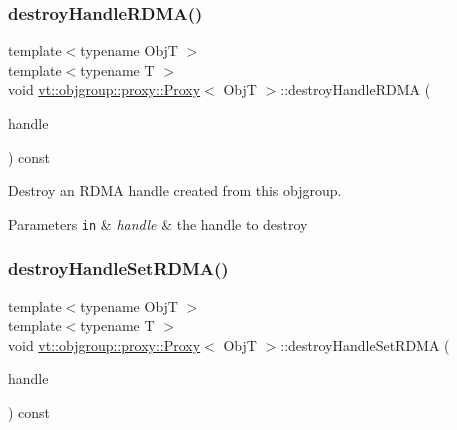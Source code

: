 \subsubsection{\texorpdfstring{destroy\+Handle\+R\+D\+M\+A()}{destroyHandleRDMA()}}
{\footnotesize\ttfamily template$<$typename ObjT $>$ \\
template$<$typename T $>$ \\
void \hyperlink{structvt_1_1objgroup_1_1proxy_1_1_proxy}{vt\+::objgroup\+::proxy\+::\+Proxy}$<$ ObjT $>$\+::destroy\+Handle\+R\+D\+MA (\begin{DoxyParamCaption}\item[{\hyperlink{structvt_1_1rdma_1_1_handle}{vt\+::rdma\+::\+Handle}$<$ T $>$}]{handle }\end{DoxyParamCaption}) const}



Destroy an R\+D\+MA handle created from this objgroup. 


\begin{DoxyParams}[1]{Parameters}
\mbox{\tt in}  & {\em handle} & the handle to destroy \\
\hline
\end{DoxyParams}
\mbox{\label{structvt_1_1objgroup_1_1proxy_1_1_proxy_a9211f7a2459cfcb28f8b90dbdc77c8bc}} 
\subsubsection{\texorpdfstring{destroy\+Handle\+Set\+R\+D\+M\+A()}{destroyHandleSetRDMA()}}
{\footnotesize\ttfamily template$<$typename ObjT $>$ \\
template$<$typename T $>$ \\
void \hyperlink{structvt_1_1objgroup_1_1proxy_1_1_proxy}{vt\+::objgroup\+::proxy\+::\+Proxy}$<$ ObjT $>$\+::destroy\+Handle\+Set\+R\+D\+MA (\begin{DoxyParamCaption}\item[{\hyperlink{structvt_1_1rdma_1_1_handle_set}{vt\+::rdma\+::\+Handle\+Set}$<$ T $>$}]{handle }\end{DoxyParamCaption}) const}



